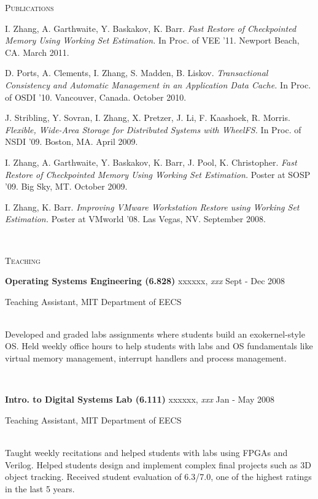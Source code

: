 \documentclass[10pt,times]{report}
\newlength{\sectiongap}
\newlength{\entrygap}
\newlength{\sectioncolwidth}
\newlength{\colgap}
\newlength{\stuffwidth}
\def\ifEqString#1#2{\def\testa{#1}\def\testb{#2}%
  \ifx\testa\testb}
\newenvironment{rtable}{
  \begin{minipage}{\textwidth}
  }{
  \end{minipage}
}
\newenvironment{rentry}[3][xxx]{
  \begin{minipage}[t]{\hsize}
    \textbf{#2}\ifEqString{#1}{xxx}\relax\else, \textit{#1}\fi
    \hspace{\stretch{1}} #3 \\
  }{
    \removelastskip
  \end{minipage}
  \\[\entrygap]  %
}
\newcommand{\rline}[2]{
  \begin{minipage}[t]{\hsize}
    #1 \hspace{\stretch{1}} #2
  \end{minipage} \\
}
\newenvironment{rsection}[1]{
  \begin{minipage}[t]{\sectioncolwidth}
    \textsc{#1}
  \end{minipage}
  \hspace{\colgap}
  \begin{minipage}[t]{\stuffwidth}
  }{
    \removelastskip
  \end{minipage}
  \\[\sectiongap]
}
\begin{document}
\begin{rtable}
\begin{rsection}{Publications}
    I. Zhang, A. Garthwaite, Y. Baskakov, K. Barr. \textit{Fast
      Restore of Checkpointed Memory Using Working Set
      Estimation.} In Proc. of VEE '11. Newport Beach, CA. March
    2011.\\\vspace{-0.5em}

    D. Ports, A. Clements, I. Zhang, S. Madden,
    B. Liskov. \textit{Transactional Consistency and Automatic
      Management in an Application Data Cache.} In Proc. of OSDI
    '10. Vancouver, Canada. October 2010.\\\vspace{-0.5em}

    J. Stribling, Y. Sovran, I. Zhang, X. Pretzer, J. Li,
    F. Kaashoek, R. Morris. \textit{Flexible, Wide-Area Storage for
      Distributed Systems with WheelFS.} In Proc. of NSDI '09. Boston,
    MA. April 2009.\\\vspace{-0.5em}
    
    I. Zhang, A. Garthwaite, Y. Baskakov, K. Barr, J. Pool,
    K. Christopher. \textit{Fast Restore of Checkpointed Memory Using
      Working Set Estimation.} Poster at SOSP '09. Big Sky,
    MT. October 2009.\\\vspace{-0.5em} 
 
   I. Zhang, K. Barr. \textit{Improving VMware Workstation Restore
      using Working Set Estimation.} Poster at VMworld '08. Las Vegas,
    NV. September 2008.
 \end{rsection}

  \vspace{1.0em}
  \begin{rsection}{Teaching}
    \begin{rentry}{Operating Systems Engineering (6.828)}{Sept - Dec
        2008}
      \rline{Teaching Assistant, MIT Department of EECS}{} 
      Developed and graded labs assignments where students build an
      exokernel-style OS. Held weekly office hours to help students
      with labs and OS fundamentals like virtual memory management,
      interrupt handlers and process management.
    \end{rentry}    

    \begin{rentry}{Intro. to Digital Systems Lab (6.111)}{Jan - May
        2008}
      \rline{Teaching Assistant, MIT Department of EECS}{} 
      Taught weekly recitations and helped students with labs using
      FPGAs and Verilog. Helped students design and implement complex
      final projects such as 3D object tracking. Received student
      evaluation of 6.3/7.0, one of the highest ratings in the last 5
      years.
    \end{rentry}    


\end{rsection}
\end{rtable}
\end{document}
